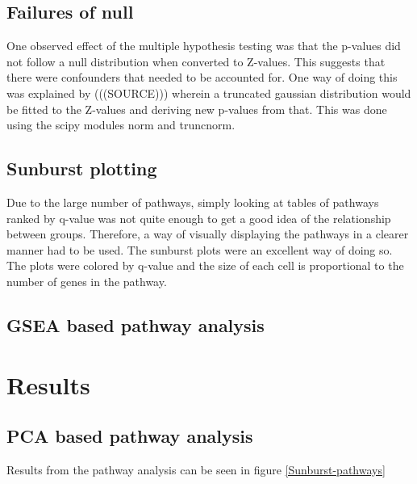 \documentclass{kththesis}
\begin{document}
     \section{Failures of null}
     One observed effect of the multiple hypothesis testing was that the p-values did not follow a null distribution when converted to Z-values. This suggests that there were confounders that needed to be accounted for. One way of doing this was explained by (((SOURCE))) wherein a truncated gaussian distribution would be fitted to the Z-values and deriving new p-values from that. This was done using the scipy modules norm and truncnorm.

     \section{Sunburst plotting}
     Due to the large number of pathways, simply looking at tables of pathways ranked by q-value was not quite enough to get a good idea of the relationship between groups. Therefore, a way of visually displaying the pathways in a clearer manner had to be used. The sunburst plots were an excellent way of doing so. The plots were colored by q-value and the size of each cell is proportional to the number of genes in the pathway.



     \section{GSEA based pathway analysis}





\chapter{Results}

     \section{PCA based pathway analysis}
     Results from the pathway analysis can be seen in figure \ref{Sunburst-pathways}
\end{document}
